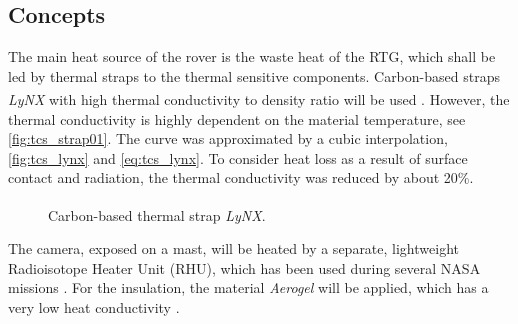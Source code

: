 \subsection{Concepts}
The main heat source of the rover is the waste heat of the RTG, which shall be led by thermal straps to the thermal sensitive components.
Carbon-based straps \textit{LyNX}\textsuperscript{\tiny\textregistered} with high thermal conductivity to density ratio will be used \cite{ref_tcs_01}.
However, the thermal conductivity is highly dependent on the material temperature, see \autoref{fig:tcs_strap01}.
The curve was approximated by  a cubic  interpolation, \autoref{fig:tcs_lynx} and \autoref{eq:tcs_lynx}.
To consider heat loss as a result of surface contact and radiation, the thermal conductivity was reduced by about 20\%.
%
\begin{figure}[h]
	\centering
	\qquad\qquad
	\caption{Carbon-based thermal strap \textit{LyNX}\textsuperscript{\tiny\textregistered}.}
	\label{fig:tcs_strap01}
\end{figure}
%
The camera, exposed on a mast, will be heated by a separate, lightweight Radioisotope Heater Unit (RHU), which has  been used during several NASA missions \cite{ref_tcs_02}.
For the insulation, the material \textit{Aerogel} will be applied, which has a very low heat conductivity \cite{ref_tcs_03}.

